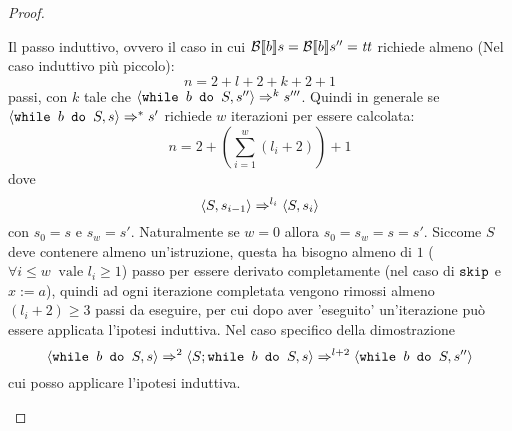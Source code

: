 {\begin{enumerate}
\begin{proof}
\begin{itemize}
\begin{itemize}
Il passo induttivo, ovvero il caso in cui $\mathcal{B} \llbracket b \rrbracket s = \mathcal{B} \llbracket b \rrbracket s'' = \mbox{\textit{tt}}$
richiede almeno (Nel caso induttivo più piccolo):
$$
n = 2 + l + 2 + k + 2 + 1
$$
passi, 
con $k$ tale che $\langle{}\mbox{\normalfont{\texttt{while }}} b \textrm{\normalfont{\texttt{ do }}} S, s''\rangle{} \Rightarrow^{k} s'''$.
Quindi in generale se $\langle{}\mbox{\normalfont{\texttt{while }}} b \textrm{\normalfont{\texttt{ do }}} S, s\rangle{} \Rightarrow^{*} s'$ richiede $w$ iterazioni per essere calcolata:
$$
n = 2 + \left(\sum_{i=1}^{w} (l_i + 2)\right) + 1
$$
dove 
$$
\langle{}S, s_{i-1}\rangle{} \Rightarrow^{l_i} \langle{}S, s_i\rangle{}
$$
con $\boxed{s_0 = s}$ e $\boxed{s_w = s'}$. Naturalmente se $w = 0$
allora $s_0 = s_w = s = s'$.
Siccome $S$ deve contenere almeno un'istruzione, questa ha bisogno almeno di $1$ ($\forall i \leq w\ \text{ vale } l_i \geq 1$) passo per
essere derivato completamente (nel caso di $\textrm{\normalfont{\texttt{skip}}}$ e $x := a$), quindi 
ad ogni iterazione completata vengono rimossi almeno $(l_i + 2) \geq 3$ passi da eseguire, 
per cui dopo aver 'eseguito' un'iterazione può essere applicata l'ipotesi induttiva.
Nel caso specifico della dimostrazione
$$
\langle{}\mbox{\normalfont{\texttt{while }}} b \textrm{\normalfont{\texttt{ do }}} S, s\rangle{} \Rightarrow^{2} \langle{}S; \mbox{\normalfont{\texttt{while }}} b \textrm{\normalfont{\texttt{ do }}} S, s\rangle{} \Rightarrow^{l+2} \langle{}\mbox{\normalfont{\texttt{while }}} b \textrm{\normalfont{\texttt{ do }}} S, s''\rangle{}
$$
cui posso applicare l'ipotesi induttiva.
\end{itemize}
\end{itemize}
\end{proof}
\end{enumerate}
}